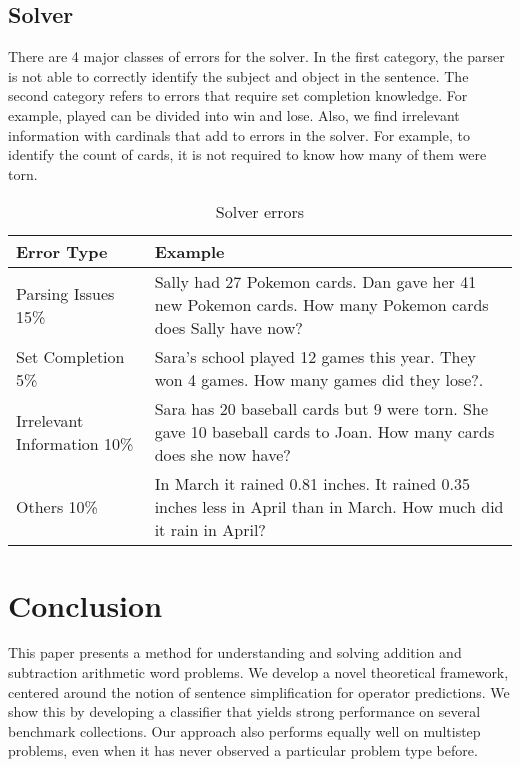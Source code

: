 \documentclass[11pt]{article}
\begin{document}
\subsection{Solver}
There are 4 major classes of errors for the solver. In the first category, the parser is not able to correctly identify the subject and object in the sentence. The second category refers to errors that require set completion knowledge. For example, played can be divided into win and lose. Also, we find irrelevant information with cardinals that add to errors in the solver. For example, to identify the count of cards, it is not required to know how many of them were torn.
\begin{table}[h!]
\centering
\begin{tabular}{|m{2cm}|m{4 cm}|}
\hline
 \textbf{Error Type} & \textbf{Example}\\ \hline
Parsing Issues 15\% & Sally had 27 Pokemon cards. Dan gave her 41 new Pokemon cards. How many Pokemon cards does Sally have now? \\ \hline
Set Completion 5\% & Sara’s school played 12 games this year. They won 4 games. How many games did they lose?. \\ \hline
Irrelevant Information 10\% & Sara has 20 baseball cards but 9 were torn. She gave 10 baseball cards to Joan. How many cards does she now have? \\ \hline
Others 10\% & In March it rained 0.81 inches. It rained 0.35 inches less in April than in March. How much did it rain in April?  \\ \hline
\end{tabular}
\caption{Solver errors}
\label{figure:16}
\end{table}


\section{Conclusion}\label{sec:conclusion}
This paper presents a method for understanding and solving addition and subtraction arithmetic word problems. We develop a novel theoretical framework, centered around the notion of sentence simplification for operator predictions. We show this by developing a classifier that yields strong performance on several benchmark collections. Our approach also performs equally well on multistep problems, even when it has never observed a particular problem type before.



\end{document}
